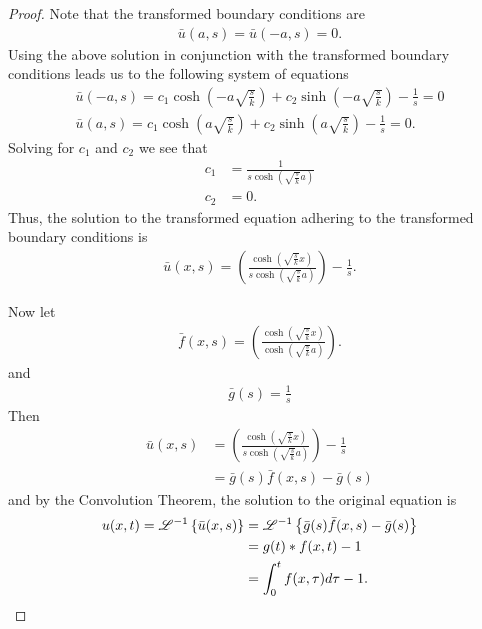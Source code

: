 \begin{proof}
  Note that the transformed boundary conditions are
  \begin{align*}
    \bar{u}(a, s) = \bar{u}(-a, s) = 0.
  \end{align*}
  Using the above solution in conjunction with the transformed boundary conditions leads us to the following system of equations
  \begin{align*}
    \bar{u}(-a, s) = c_1 \cosh\left(-a\sqrt{\frac{s}{k}} \right) + c_2 \sinh\left(-a\sqrt{\frac{s}{k}} \right) -\frac{1}{s} = 0 \\
    \bar{u}(a, s) = c_1 \cosh\left(a\sqrt{\frac{s}{k}} \right) + c_2 \sinh\left(a\sqrt{\frac{s}{k}} \right) -\frac{1}{s} = 0.
  \end{align*}
  Solving for $c_1$ and $c_2$ we see that
  \begin{align*}
    c_1 &= \frac{1}{s\cosh\left(\sqrt{\frac{s}{k}}a\right)} \\
    c_2 &= 0.
  \end{align*}
  Thus, the solution to the transformed equation adhering to the transformed boundary conditions is
  \begin{align*}
    \bar{u}(x, s) = \left(\frac{\cosh\left(\sqrt{\frac{s}{k}} x\right)}{s\cosh\left(\sqrt{\frac{s}{k}}a\right)}\right) -\frac{1}{s}.
  \end{align*}

  Now let
  \begin{align*}
    \bar{f}(x, s) = \left(\frac{\cosh\left(\sqrt{\frac{s}{k}} x\right)}{\cosh\left(\sqrt{\frac{s}{k}}a\right)}\right).
  \end{align*}
  and
  \begin{align*}
    \bar{g}(s) = \frac{1}{s}
  \end{align*}
  Then
  \begin{align*}
    \bar{u}(x, s) &= \left(\frac{\cosh\left(\sqrt{\frac{s}{k}} x\right)}{s\cosh\left(\sqrt{\frac{s}{k}}a\right)}\right) -\frac{1}{s} \\
    &= \bar{g}(s)\bar{f}(x, s) - \bar{g}(s)
  \end{align*}
  and by the Convolution Theorem, the solution to the original equation is
  \begin{align*}
    u(x, t) = \mathscr{L}^{-1}\left\{ {\bar{u}(x, s)} \right\} &= \mathscr{L}^{-1}\left\{ {\bar{g}(s)\bar{f}(x, s) - \bar{g}(s)} \right\}\\
    &= g(t) \ast f(x, t) - 1 \\
    &= \int_0^t f(x, \tau) d\tau - 1.
  \end{align*}
\end{proof}
\newpage
